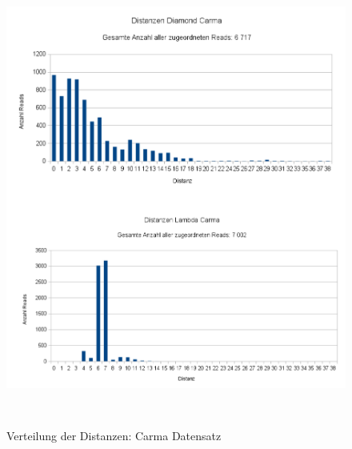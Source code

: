 \documentclass[10pt, a4paper]{article}[08.12.2015]
\begin{document}
    \begin{figure}[H]
      \centering
      \noindent\includegraphics[width=\linewidth,height=15cm,
      keepaspectratio]{Abbildungen/Carma_Distanzen_both.png}
      \caption{Verteilung der Distanzen: Carma Datensatz}
      \centering     
    \end{figure}
\end{document}
